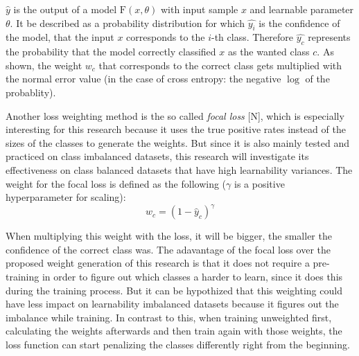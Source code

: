 \documentclass[journal]{IEEEtran}
\begin{document}
$\hat{y}$ is the output of a model $\text{F}(x, \theta)$ with input sample $x$ and learnable parameter $\theta$. 
It be described as a probability distribution for which $\hat{y_i}$ is the confidence of the model, that the input $x$ corresponds to the $i$-th class.
Therefore $\hat{y_c}$ represents the probability that the model correctly classified $x$ as the wanted class $c$. 
As shown, the weight $w_c$ that corresponds to the correct class gets multiplied with the normal error value (in the case of cross entropy: the negative $\log$ of the probablity).


Another loss weighting method is the so called \emph{focal loss} [N], which is especially interesting for this research because it uses the true positive rates instead of the sizes of the classes to generate the weights.
But since it is also mainly tested and practiced on class imbalanced datasets, this research will investigate its effectiveness on class balanced datasets that have high learnability variances.
The weight for the focal loss is defined as the following ($\gamma$ is a positive hyperparameter for scaling):
\[ w_c = (1 - \hat{y}_c)^\gamma \]

When multiplying this weight with the loss, it will be bigger, the smaller the confidence of the correct class was. 
The adavantage of the focal loss over the proposed weight generation of this research is that it does not require a pre-training in order to figure out which classes a harder to learn, since it does this during the training process.
But it can be hypothized that this weighting could have less impact on learnability imbalanced datasets because it figures out the imbalance while training.
In contrast to this, when training unweighted first, calculating the weights afterwards and then train again with those weights, the loss function can start penalizing the classes differently right from the beginning.

\end{document}
